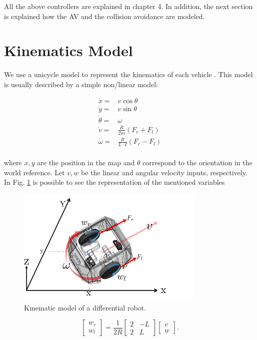 All the above controllers are explained in chapter 4. In addition, the next section is explained how the AV and the collision avoidance are modeled. 

\section{Kinematics Model}
We use a unicycle model to represent the kinematics of each vehicle \cite{kinematic}. This model is usually described by a simple non/linear model: 


\begin{equation}
\begin{align*}
  \dot{x} =& v \cos{\theta}\\ 
  \dot{y} =& v \sin{\theta} \\
\dot{\theta} =& \omega  \\ 
\dot{v} =& \frac{R}{2m} (F_{r} + F_{l}) \\ 
\dot{\omega} =& \frac{R}{L \cdot I} (F_{r} - F_{l})  \\ 
\end{align*}
\end{equation}

where $x,y$ are the position in the map and $\theta$ correspond to the orientation in the world reference. Let $v, w$ be the linear and angular velocity inputs, respectively. In Fig. \ref{kinematic2} is possible to see the representation of the mentioned variables


\begin{figure}
\begin{center}
    \includegraphics[width=0.8\textwidth]{Kap3/kinematic.png}
    \caption{Kinematic model of a differential robot.}
    \label{kinematic2}
\end{center}
\end{figure}


\begin{equation}
\begin{bmatrix}
w_{r}\\ w_{l}
\end{bmatrix} =  \frac{1}{2R}\begin{bmatrix}
2 & -L\\ 
2 & L
\end{bmatrix} \begin{bmatrix}
v\\ w
\end{bmatrix}.
\label{dif_equat}
\end{equation}

